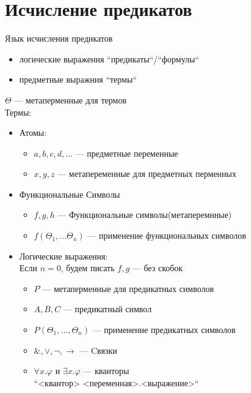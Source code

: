 \documentclass[english]{article}
\begin{document}
\section{Исчисление предикатов}
\label{sec:org2f6c2bf}
\begin{definition}
	Язык исчисления предикатов
	\begin{itemize}
		\item логические выражения ``предикаты``/``формулы``
		\item предметные выражния ``термы``
	\end{itemize}
	\(\Theta\) --- метаперменные для термов \\
	Термы:
	\begin{itemize}
		\item Атомы:
		      \begin{itemize}
			      \item \(a, b, c, d, \dots\) --- предметные переменные
			      \item \(x, y, z\) --- метапеременные для предметных перменных
		      \end{itemize}
		\item Функциональные Символы
		      \begin{itemize}
			      \item \(f, g, h\) --- Функциональные символы(метаперемнные)
			      \item \(f(\Theta_1, \dots \Theta_n)\) --- применение функциональных символов
		      \end{itemize}
		\item Логические выражения: \\
		      \color{gray}Если \(n = 0\), будем писать \(f, g\) --- без скобок\color{black}
		      \begin{itemize}
			      \item \(P\) --- метаперменные для предикатных символов
			      \item \(A, B, C\) --- предикатный символ
			      \item \(P(\Theta_1, \dots, \Theta_n)\) --- применение предикатных символов
			      \item \(\&, \vee, \neg, \to\) --- Cвязки
			      \item \(\forall x.\varphi\) и \(\exists x.\varphi\) --- кванторы \\
			            \color{gray}``<квантор> <переменная>.<выражение>``\color{black} \\
		      \end{itemize}
	\end{itemize}
	\label{org32cbc3d}
\end{definition}
\end{document}

